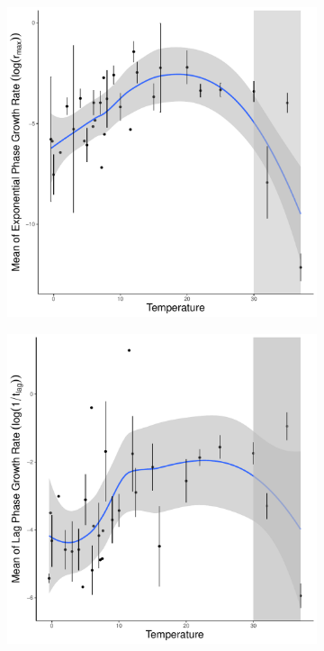 \documentclass[a4paper]{article}
\begin{document}
\begin{figure}[ht!]
\begin{subfigure}{.47\textwidth}
      \caption{}
      \label{fig:log_1tlag_temp}
    \end{subfigure}
    \begin{subfigure}{.47\textwidth}
      \centering
      \includegraphics[width=.9\linewidth]{Plot/log_mean_r_temp.pdf}
      \caption{}
      \label{fig:log_mean_r_temp}
    \end{subfigure}%
    \begin{subfigure}{.47\textwidth}
      \centering
      \includegraphics[width=.9\linewidth]{Plot/log_mean_1tlag_temp.pdf}

\end{subfigure}
\end{figure}
\end{document}
